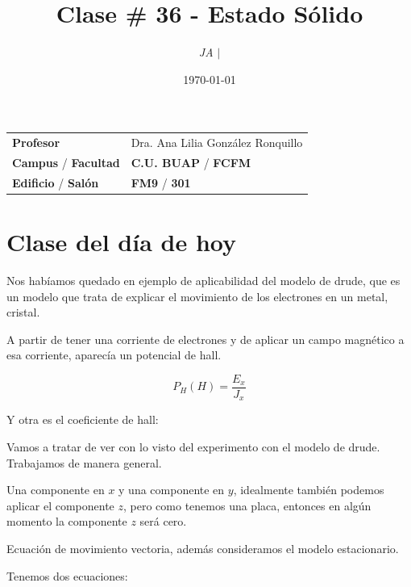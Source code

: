 \documentclass{article}
\title{Clase \# 36 - Estado Sólido}
\author{\emph{JA} $\boldsymbol{\mid}$}
\date{\today}
\begin{document}
\maketitle



\begin{mybox}
\noindent\begin{tabular}{@{}ll}
	{\bfseries{Profesor}} & Dra. Ana Lilia González Ronquillo\\
	\textcolor{prussianblue}{\bfseries{Campus}} / \textcolor{trueblue}{\bfseries{Facultad}}  & \textcolor{prussianblue}{\bfseries{C.U. BUAP}} /  \textcolor{trueblue}{\bfseries{FCFM}} \\
	\textcolor{prussianblue}{\bfseries{Edificio}} /  \textcolor{trueblue}{\bfseries{Salón}}    & 	\textcolor{prussianblue}{\bfseries{FM9}} /  \textcolor{trueblue}{\bfseries{301}}   
\end{tabular} 
\end{mybox} \vspace{1cm}

\tableofcontents

\vspace{2cm}


\section*{Clase del día de hoy}

Nos habíamos quedado en ejemplo de aplicabilidad del modelo de drude, que es un modelo que trata de explicar el movimiento de los electrones en un metal, cristal.

A partir de tener una corriente de electrones y de aplicar un campo magnético a esa corriente, aparecía un potencial de hall.


\[ P_{H}(H) = \frac{E_{x}}{J_{x}} \]

Y otra es el coeficiente de hall:

Vamos a tratar de ver con lo visto del experimento con el modelo de drude. Trabajamos de manera general.


Una componente en $x$ y una componente en $y$, idealmente también podemos aplicar el componente $z$, pero como tenemos una placa, entonces en algún momento la componente $z$ será cero.



Ecuación de movimiento vectoria, además consideramos el modelo estacionario.

Tenemos dos ecuaciones:
\end{document}
